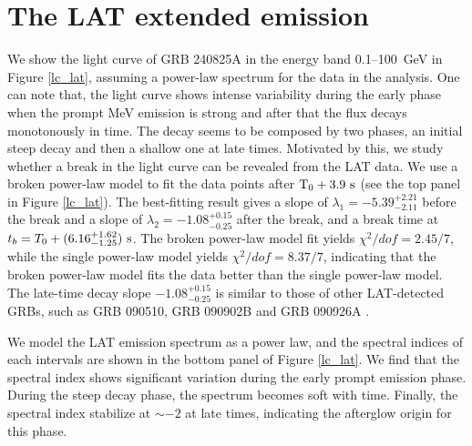 \documentclass[twocolumn]{aastex631}
\begin{document}
\section{The LAT extended emission } 
\label{sec:lat_extended}
We show the light curve of GRB 240825A in the energy band 0.1--100~GeV in Figure \ref{lc_lat}, assuming a power-law spectrum for the data in the analysis. One can note that, the light curve shows intense variability during the early phase when the prompt MeV emission is strong and after that the flux decays monotonously in time. The decay seems to be composed by two phases, an initial steep decay and then a shallow one at late times. Motivated by this, we study whether a break in the light curve can be revealed from the LAT data. 
We use a broken power-law model to fit the data points after $\rm T_0 + 3.9~s$ (see the top panel in Figure \ref{lc_lat}). The best-fitting result gives a slope of $\lambda_1=-5.39^{+2.21}_{-2.11}$ before the break and a slope of $\lambda_2=-1.08^{+0.15}_{-0.25}$ after the break, and a break time at $t_b=T_0+(6.16^{+1.62}_{-1.25}) ~{\rm s}$. The broken power-law model fit yields $\chi^2/dof=2.45/7$, while  the single power-law model yields $\chi^2/dof=8.37/7$, indicating that the broken power-law model  fits the data better than  the single power-law model. The late-time decay slope ${-1.08^{+0.15}_{-0.25}}$ is similar to those
of other LAT-detected GRBs, such as GRB 090510, GRB 090902B and GRB 090926A \citep{2009Natur.462..331A,2009ApJ...706L.138A,2011ApJ...729..114A}.

We model the LAT emission spectrum as a power law, and the spectral indices of each intervals are shown in the bottom panel of Figure \ref{lc_lat}. We find that the spectral index shows significant variation during  the early prompt emission phase. During the steep decay phase, the spectrum becomes soft with time. Finally, the spectral index stabilize at $\sim -2$  at  late times,  indicating the afterglow  origin for this phase.

\end{document}
